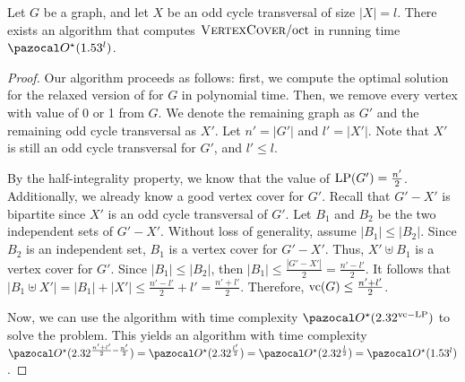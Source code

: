 \begin{theorem}
    Let $G$ be a graph, and let $X$ be an odd cycle transversal of size $|X| = l$. There exists an algorithm that computes $\textsc{VertexCover}/\text{oct}$ in running time $\O^\star(1.53^l)$.
\end{theorem}

\begin{proof}
    Our algorithm proceeds as follows: first, we compute the optimal solution for the relaxed version of  for $G$ in polynomial time. Then, we remove every vertex with value of 0 or 1 from $G$. We denote the remaining graph as $G'$ and the remaining odd cycle transversal as $X'$. Let $n' = |G'|$ and $l' = |X'|$. Note that $X'$ is still an odd cycle transversal for $G'$, and $l' \leq l$.

    By the half-integrality property, we know that the value of $\text{LP}(G') = \frac{n'}{2}$. Additionally, we already know a good vertex cover for $G'$. Recall that $G' - X'$ is bipartite since $X'$ is an odd cycle transversal of $G'$. Let $B_1$ and $B_2$ be the two independent sets of $G' - X'$. Without loss of generality, assume $|B_1| \leq |B_2|$. Since $B_2$ is an independent set, $B_1$ is a vertex cover for $G' - X'$. Thus, $X' \uplus B_1$ is a vertex cover for $G'$. Since $|B_1| \leq |B_2|$, then $|B_1| \leq \frac{|G' - X'|}{2} = \frac{n' - l'}{2}$. It follows that $|B_1 \uplus X'| = |B_1| + |X'| \leq \frac{n' - l'}{2} + l' = \frac{n' + l'}{2}$. Therefore, $\text{vc}(G) \leq \frac{n' + l'}{2}$.

    Now, we can use the algorithm with time complexity $\O^\star(2.32^{\vc - \LP})$ to solve the problem. This yields an algorithm with time complexity $\O^\star(2.32^{\frac{n' + l'}{2} - \frac{n'}{2}}) = \O^\star(2.32^{\frac{l'}{2}}) = \O^\star(2.32^{\frac{l}{2}}) = \O^\star(1.53^l)$.
\end{proof}